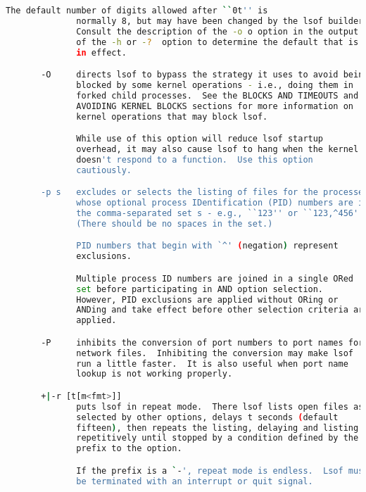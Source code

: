 {{\begin{lstlisting}[language=bash]
              The default number of digits allowed after ``0t'' is
              normally 8, but may have been changed by the lsof builder.
              Consult the description of the -o o option in the output
              of the -h or -?  option to determine the default that is
              in effect.

       -O     directs lsof to bypass the strategy it uses to avoid being
              blocked by some kernel operations - i.e., doing them in
              forked child processes.  See the BLOCKS AND TIMEOUTS and
              AVOIDING KERNEL BLOCKS sections for more information on
              kernel operations that may block lsof.

              While use of this option will reduce lsof startup
              overhead, it may also cause lsof to hang when the kernel
              doesn't respond to a function.  Use this option
              cautiously.

       -p s   excludes or selects the listing of files for the processes
              whose optional process IDentification (PID) numbers are in
              the comma-separated set s - e.g., ``123'' or ``123,^456''.
              (There should be no spaces in the set.)

              PID numbers that begin with `^' (negation) represent
              exclusions.

              Multiple process ID numbers are joined in a single ORed
              set before participating in AND option selection.
              However, PID exclusions are applied without ORing or
              ANDing and take effect before other selection criteria are
              applied.

       -P     inhibits the conversion of port numbers to port names for
              network files.  Inhibiting the conversion may make lsof
              run a little faster.  It is also useful when port name
              lookup is not working properly.

       +|-r [t[m<fmt>]]
              puts lsof in repeat mode.  There lsof lists open files as
              selected by other options, delays t seconds (default
              fifteen), then repeats the listing, delaying and listing
              repetitively until stopped by a condition defined by the
              prefix to the option.

              If the prefix is a `-', repeat mode is endless.  Lsof must
              be terminated with an interrupt or quit signal.


\end{lstlisting}}}
